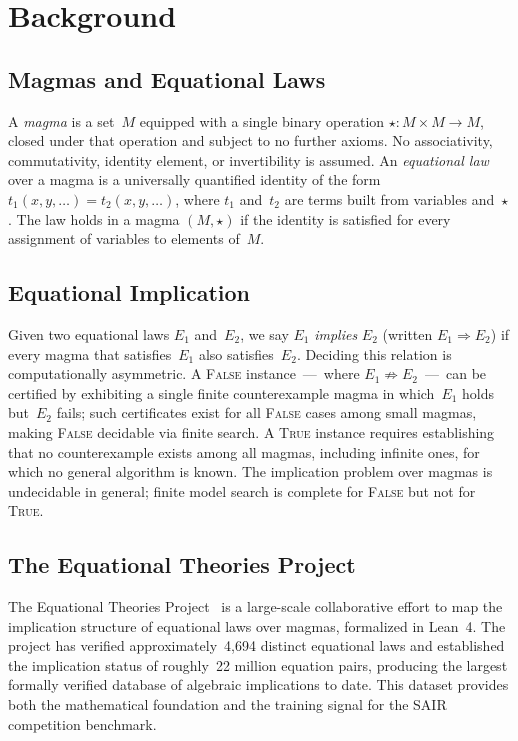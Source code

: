\documentclass[11pt]{article}
\begin{document}
\section{Background}
\label{sec:background}

\subsection{Magmas and Equational Laws}

A \emph{magma} is a set~$M$ equipped with a single binary operation
${\star} : M \times M \to M$, closed under that operation and subject
to no further axioms. No associativity, commutativity, identity
element, or invertibility is assumed. An \emph{equational law} over a
magma is a universally quantified identity of the form
$t_1(x, y, \ldots) = t_2(x, y, \ldots)$, where $t_1$ and~$t_2$ are
terms built from variables and~$\star$. The law holds in a magma
$(M,\star)$ if the identity is satisfied for every assignment of
variables to elements of~$M$.

\subsection{Equational Implication}

Given two equational laws $E_1$ and~$E_2$, we say $E_1$ \emph{implies}
$E_2$ (written $E_1 \Rightarrow E_2$) if every magma that
satisfies~$E_1$ also satisfies~$E_2$. Deciding this relation is
computationally asymmetric. A \textsc{False} instance~---~where
$E_1 \not\Rightarrow E_2$~---~can be certified by exhibiting a single
finite counterexample magma in which~$E_1$ holds but~$E_2$ fails; such
certificates exist for all \textsc{False} cases among small magmas,
making \textsc{False} decidable via finite search. A \textsc{True}
instance requires establishing that no counterexample exists among all
magmas, including infinite ones, for which no general algorithm is
known. The implication problem over magmas is undecidable in general;
finite model search is complete for \textsc{False} but not for
\textsc{True}.

\subsection{The Equational Theories Project}

The Equational Theories Project~\citep{tao2025etp} is a large-scale
collaborative effort to map the implication structure of equational laws
over magmas, formalized in Lean~4. The project has verified
approximately~4{,}694 distinct equational laws and established the
implication status of roughly~22 million equation pairs, producing the
largest formally verified database of algebraic implications to date.
This dataset provides both the mathematical foundation and the training
signal for the SAIR competition benchmark.
\end{document}
